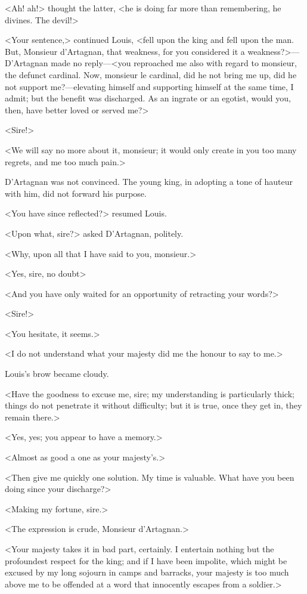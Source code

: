 <Ah! ah!> thought the latter, <he is doing far more than remembering, he divines. The devil!>

<Your sentence,> continued Louis, <fell upon the king and fell upon the man. But, Monsieur d'Artagnan, that weakness, for you considered it a weakness?>—D'Artagnan made no reply—<you reproached me also with regard to monsieur, the defunct cardinal. Now, monsieur le cardinal, did he not bring me up, did he not support me?—elevating himself and supporting himself at the same time, I admit; but the benefit was discharged. As an ingrate or an egotist, would you, then, have better loved or served me?>

<Sire!>

<We will say no more about it, monsieur; it would only create in you too many regrets, and me too much pain.>

D'Artagnan was not convinced. The young king, in adopting a tone of hauteur with him, did not forward his purpose.

<You have since reflected?> resumed Louis.

<Upon what, sire?> asked D'Artagnan, politely.

<Why, upon all that I have said to you, monsieur.>

<Yes, sire, no doubt\longdash>

<And you have only waited for an opportunity of retracting your words?>

<Sire!>

<You hesitate, it seems.>

<I do not understand what your majesty did me the honour to say to me.>

Louis's brow became cloudy.

<Have the goodness to excuse me, sire; my understanding is particularly thick; things do not penetrate it without difficulty; but it is true, once they get in, they remain there.>

<Yes, yes; you appear to have a memory.>

<Almost as good a one as your majesty's.>

<Then give me quickly one solution. My time is valuable. What have you been doing since your discharge?>

<Making my fortune, sire.>

<The expression is crude, Monsieur d'Artagnan.>

<Your majesty takes it in bad part, certainly. I entertain nothing but the profoundest respect for the king; and if I have been impolite, which might be excused by my long sojourn in camps and barracks, your majesty is too much above me to be offended at a word that innocently escapes from a soldier.>

